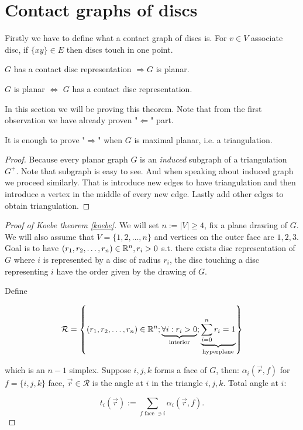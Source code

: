 \chapter{Contact graphs of discs}

Firstly we have to define what a contact graph of discs is. For $v \in V$ associate disc, if $\{xy\} \in E$ then discs touch in one point.

\begin{observ}
	$G$ has a contact disc representation $\Rightarrow G$ is planar.
\end{observ}

\begin{thm}[Koebe]
	$G$ is planar $\iff$ $G$ has a contact disc representation.
	\label{koebe}
\end{thm}

In this section we will be proving this theorem. Note that from the first observation we have already proven "$\Leftarrow$" part.

\begin{observ}
	It is enough to prove "$\Rightarrow$" when $G$ is maximal planar, i.e. a triangulation.
\end{observ}

\begin{proof}
	Because every planar graph $G$ is an \textit{induced} subgraph of a triangulation $G^+$. Note that subgraph is easy to see. And when speaking about induced graph we proceed similarly. That is introduce new edges to have triangulation and then introduce a vertex in the middle of every new edge. Lastly add other edges to obtain triangulation.
\end{proof}

\begin{proof}[Proof of Koebe theorem \ref{koebe}]
	We will set $n := |V| \geq 4$, fix a plane drawing of $G$. We will also assume that $V = \{1,2, \dots, n\}$ and vertices on the outer face are $1,2,3$. Goal is to have $(r_1, r_2, \dots, r_n) \in \mathbb{R}^n, r_i > 0$ s.t. there exists disc representation of $G$ where $i$ is represented by a disc of radius $r_i$, the disc touching a disc representing $i$ have the order given by the drawing of $G$.
	
	Define
	
	$$
	\mathcal{R} = \left\{(r_1, r_2, \dots, r_n) \in \mathbb{R}^n; \underbrace{\forall i : r_i > 0}_{\text{interior}}; \underbrace{\sum_{i = 0}^n r_i = 1}_{\text{hyperplane}}\right\}
	$$
	
	\noindent which is an $n-1$ simplex. Suppose $i,j,k$ forms a face of $G$, then: $\alpha_i(\overrightarrow{r},f)$ for $f = \{i,j,k\}$ face, $\overrightarrow{r} \in \mathcal{R}$ is the angle at $i$ in the triangle $i,j,k$. Total angle at $i$:
	
	$$
	t_i(\overrightarrow{r}) := \sum_{f \text{ face } \ni i} \alpha_i(\overrightarrow{r}, f).
	$$
\end{proof}